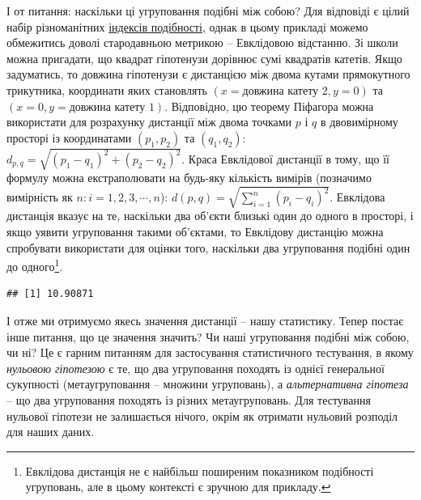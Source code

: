 \documentclass[
  11pt,
]{book}
\newenvironment{Shaded}{\begin{snugshade}}{\end{snugshade}}
\newcommand{\ControlFlowTok}[1]{\textcolor[rgb]{0.13,0.29,0.53}{\textbf{#1}}}
\newcommand{\DecValTok}[1]{\textcolor[rgb]{0.00,0.00,0.81}{#1}}
\newcommand{\FunctionTok}[1]{\textcolor[rgb]{0.13,0.29,0.53}{\textbf{#1}}}
\newcommand{\NormalTok}[1]{#1}
\newcommand{\OtherTok}[1]{\textcolor[rgb]{0.56,0.35,0.01}{#1}}
\newcommand{\SpecialCharTok}[1]{\textcolor[rgb]{0.81,0.36,0.00}{\textbf{#1}}}
\begin{document}
І от питання: наскільки ці угруповання подібні між собою? Для відповіді є цілий набір різноманітних \hyperref[similarity]{індексів подібності}, однак в цьому прикладі можемо обмежитись доволі стародавньою метрикою -- Евклідовою відстанню. Зі школи можна пригадати, що квадрат гіпотенузи дорівнює сумі квадратів катетів. Якщо задуматись, то довжина гіпотенузи є дистанцією між двома кутами прямокутного трикутника, координати яких становлять \((x = \text{довжина катету 2}, y = 0)\) та \((x = 0, y = \text{довжина катету 1})\). Відповідно, цю теорему Піфагора можна використати для розрахунку дистанції між двома точками \(p\) і \(q\) в двовимірному просторі із координатами \((p_1, p_2)\) та \((q_1, q_2)\): \(d_{p, q}= \sqrt{(p_1 - q_1)^2 + (p_2 - q_2)^2}\). Краса Евклідової дистанції в тому, що її формулу можна екстраполювати на будь-яку кількість вимірів (позначимо вимірність як \(n: i = 1, 2, 3, \cdots, n\)): \(d(p, q) = \sqrt{\sum_{i=1}^n (p_i - q_i)^2}\). Евклідова дистанція вказує на те, наскільки два об'єкти близькі один до одного в просторі, і якщо уявити угруповання такими об'єктами, то Евклідову дистанцію можна спробувати використати для оцінки того, наскільки два угруповання подібні один до одного\footnote{Евклідова дистанція не є найбільш поширеним показником подібності угруповань, але в цьому контексті є зручною для прикладу.}.

\begin{Shaded}
\end{Shaded}

\begin{verbatim}
## [1] 10.90871
\end{verbatim}

І отже ми отримуємо якесь значення дистанції -- нашу статистику. Тепер постає інше питання, що це значення значить? Чи наші угруповання подібні між собою, чи ні? Це є гарним питанням для застосування статистичного тестування, в якому \emph{нульовою гіпотезою} є те, що два угруповання походять із однієї генеральної сукупності (метаугруповання -- множини угруповань), а \emph{альтернативна гіпотеза} -- що два угруповання походять із різних метаугруповань. Для тестування нульової гіпотези не залишається нічого, окрім як отримати нульовий розподіл для наших даних.
\end{document}
